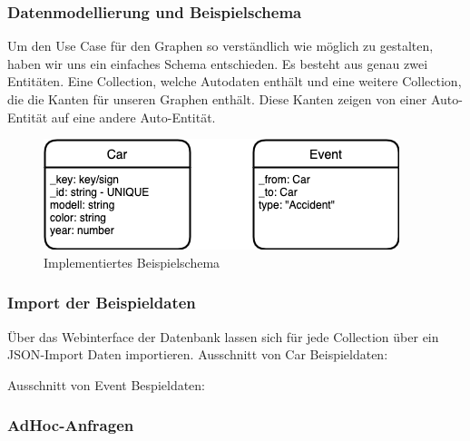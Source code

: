 \subsubsection{Datenmodellierung und Beispielschema}
Um den Use Case für den Graphen so verständlich wie möglich zu gestalten, haben wir uns ein einfaches Schema entschieden. Es besteht aus genau zwei Entitäten. Eine Collection, welche Autodaten enthält und eine weitere Collection, die die Kanten für unseren Graphen enthält. Diese Kanten zeigen von einer Auto-Entität auf eine andere Auto-Entität.
\begin{figure}[htbp] 
  	\centering
     \includegraphics[width=.7\textwidth]{./images/Schema.png}
 	\caption{Implementiertes Beispielschema}
  \label{fig:DataSchema}
\end{figure}
\subsubsection{Import der Beispieldaten}
Über das Webinterface der Datenbank lassen sich für jede Collection über ein \ac{JSON}-Import Daten importieren.
Ausschnitt von Car Beispieldaten:

Ausschnitt von Event Bespieldaten:

\subsubsection{AdHoc-Anfragen}

